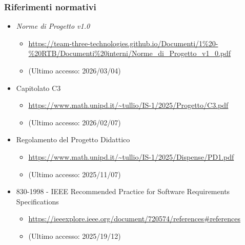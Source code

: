 \documentclass[a4paper,12pt]{article}
\begin{document}
{{            \subsubsection{Riferimenti normativi} {
                \begin{itemize}
                    \item \textit{Norme di Progetto v1.0}
                    \begin{itemize}
                        \item \url{https://team-three-technologies.github.io/Documenti/1%20-%20RTB/Documenti%20interni/Norme_di_Progetto_v1_0.pdf}
                        \item[] (Ultimo accesso: 2026/03/04)
                    \end{itemize}
                    \item Capitolato C3
                    \begin{itemize}
                        \item {\url{https://www.math.unipd.it/~tullio/IS-1/2025/Progetto/C3.pdf}}
                        \item[] (Ultimo accesso: 2026/02/07)
                    \end{itemize}
                    \item Regolamento del Progetto Didattico
                    \begin{itemize}
                        \item \url{https://www.math.unipd.it/~tullio/IS-1/2025/Dispense/PD1.pdf}
                        \item[] (Ultimo accesso: 2025/11/07)
                    \end{itemize}
                    \item 830-1998 - IEEE Recommended Practice for Software Requirements Specifications
                    \begin{itemize}
                        \item \url{https://ieeexplore.ieee.org/document/720574/references#references}
                        \item[] (Ultimo accesso: 2025/19/12)
                    \end{itemize}
                \end{itemize}
            }
}}
\end{document}
